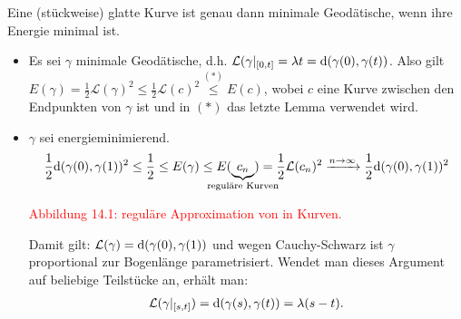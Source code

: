 \begin{Satz}
  Eine (stückweise) glatte Kurve ist genau dann minimale Geodätische, wenn ihre Energie minimal ist.
\end{Satz}

\begin{bew}
  \begin{itemize}[label=\quot{$\Rightarrow$}]
  \item Es sei $\gamma$ minimale Geodätische, d.h. $\mathcal L(\gamma|_{[0,t]} = \lambda t = \mathrm{d} (\gamma(0),\gamma(t))$.
    Also gilt $E(\gamma) = \frac{1}2 \mathcal L(\gamma)^2 \leq \frac{1}2 \mathcal L(c)^2 \overset{(*)}{\leq} E(c)$, wobei $c$ eine Kurve zwischen den Endpunkten von $\gamma$ ist und in $(*)$ das letzte Lemma verwendet wird.
  \end{itemize}
  \begin{itemize}[label=\quot{$\Leftarrow$}]
  \item $\gamma$ sei energieminimierend.
    \begin{align*}
      \frac{1}2 \dop (\gamma(0), \gamma(1))^2 \leq \frac{1}2 \leq E(\gamma) \leq E(\underbrace{c_n}_{\mathclap{\text{reguläre Kurven}}}) = \frac{1}2 \mathcal L(c_n)^2 \xrightarrow{n\to\infty} \frac{1}2 \dop(\gamma(0),\gamma(1))^2
    \end{align*}

    \textcolor{red}{Abbildung 14.1: reguläre Approximation von  in Kurven.}

    Damit gilt: $\mathcal L(\gamma) = \mathrm{d}(\gamma(0),\gamma(1))$ und wegen Cauchy-Schwarz ist $\gamma$ proportional zur Bogenlänge parametrisiert.
    Wendet man dieses Argument auf beliebige Teilstücke an, erhält man:
    \begin{align*}
      \mathcal L(\gamma|_{[s,t]}) = \mathrm{d}(\gamma(s),\gamma(t)) = \lambda(s-t).
    \end{align*}

  \end{itemize}
\end{bew}

